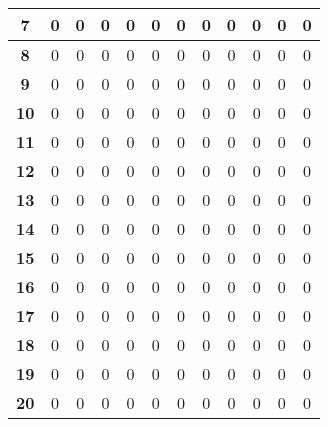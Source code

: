 \documentclass[11pt,a4paper,oneside]{report}
\begin{document}
\begin{table}[H]
\begin{tabular}{|c|c|c|c|c|c|c|c|c|c|c|c|}
\textbf{7}      & 0          & 0          & 0          & 0          & 0          & 0          & 0          & 0          & 0          & 0          & 0           \\ \hline
\textbf{8}      & 0          & 0          & 0          & 0          & 0          & 0          & 0          & 0          & 0          & 0          & 0           \\ \hline
\textbf{9}      & 0          & 0          & 0          & 0          & 0          & 0          & 0          & 0          & 0          & 0          & 0           \\ \hline
\textbf{10}     & 0          & 0          & 0          & 0          & 0          & 0          & 0          & 0          & 0          & 0          & 0           \\ \hline
\textbf{11}     & 0          & 0          & 0          & 0          & 0          & 0          & 0          & 0          & 0          & 0          & 0           \\ \hline
\textbf{12}     & 0          & 0          & 0          & 0          & 0          & 0          & 0          & 0          & 0          & 0          & 0           \\ \hline
\textbf{13}     & 0          & 0          & 0          & 0          & 0          & 0          & 0          & 0          & 0          & 0          & 0           \\ \hline
\textbf{14}     & 0          & 0          & 0          & 0          & 0          & 0          & 0          & 0          & 0          & 0          & 0           \\ \hline
\textbf{15}     & 0          & 0          & 0          & 0          & 0          & 0          & 0          & 0          & 0          & 0          & 0           \\ \hline
\textbf{16}     & 0          & 0          & 0          & 0          & 0          & 0          & 0          & 0          & 0          & 0          & 0           \\ \hline
\textbf{17}     & 0          & 0          & 0          & 0          & 0          & 0          & 0          & 0          & 0          & 0          & 0           \\ \hline
\textbf{18}     & 0          & 0          & 0          & 0          & 0          & 0          & 0          & 0          & 0          & 0          & 0           \\ \hline
\textbf{19}     & 0          & 0          & 0          & 0          & 0          & 0          & 0          & 0          & 0          & 0          & 0           \\ \hline
\textbf{20}     & 0          & 0          & 0          & 0          & 0          & 0          & 0          & 0          & 0          & 0          & 0           \\ \hline
\end{tabular}
\end{table}
\end{document}
